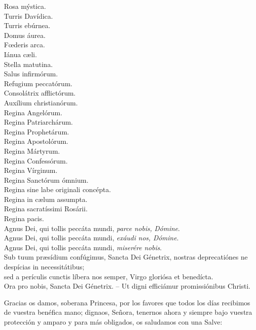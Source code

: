 \documentclass[./rosary.tex]{subfiles}
\begin{document}
\begin{multicols}{2}
    Rosa mýstica.\\
    Turris Davídica.\\
    Turris ebúrnea.\\
    Domus áurea.\\
    Fœderis arca.\\
    Iánua cæli.\\
    Stella matutina.\\
    Salus infirmórum.\\
    Refugium peccatórum.\\
    Consolátrix af­flic­tórum.\\
    Auxílium chris­tia­nórum.\\
    Regina Angelórum.\\
    Regina Pa­triar­chárum.\\
    Regina Pro­phe­tárum.\\
    Regina Apos­to­lórum.\\
    Regina Mártyrum.\\
    Regina Con­fe­ssórum.\\
    Regina Vírginum.\\
    Regina Sanctórum ómnium.\\
    Regina sine labe originali concépta.\\
    Regina in cælum assumpta.\\
    Regina sa­cra­tíssimi Rosárii.\\
    Regina pacis.\\
    Agnus Dei, qui tollis peccáta mundi, \emph{parce nobis, Dómine}.\\
    Agnus Dei, qui tollis peccáta mundi, \emph{exáudi nos, Dómine}.\\
    Agnus Dei, qui tollis peccáta mundi, \emph{miserére nobis}.\\
    Sub tuum præsídium confúgimus, Sancta Dei Génetrix, nostras de­pre­ca­tiónes ne despícias in ne­ces­si­tátibus;\\
    sed a perículis cunctis líbera nos semper, Virgo gloriósa et benedícta.\\
    Ora pro nobis, Sancta Dei Génetrix. -- Ut digni efficiámur pro­mi­ssiónibus Christi.
\end{multicols}

Gracias os damos, soberana Princesa, por los favores que todos los días recibimos de vuestra benéfica mano; dignaos, Señora, tenernos ahora
y siempre bajo vuestra protección y amparo y para más obligados, os saludamos con una Salve:
\end{document}
